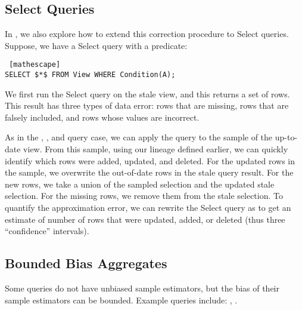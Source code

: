 \iffalse
\begin{proposition} (BOOTSTRAP OVER DIFFERENCES) Let q be an aggregate query that has an unbiased sample estimate, and let $\hat{S}$ and $\hat{S'}$ be sample views as defined before. 
One sample of the bootstrap estimator $s$ is defined as the difference of q applied to random subsample of size $b_1$ (with replacement) of $\hat{S}$ and $\hat{S'}$.
We denote subsamples of the samples as $\hat{S'}_{sub}$ and $\hat{S}_{sub}$ respectively.
\[q(\hat{S'}_{sub}) - q(\hat{S}_{sub})\]
To build the confidence interval, we repeatedly apply this procedure $b_2$ times.
\end{proposition}
\fi

\vspace{-.25em}
\subsection{Select Queries}
In \svc, we also explore how to extend this correction procedure to Select queries.
Suppose, we have a Select query with a predicate:
\begin{lstlisting} [mathescape]
SELECT $*$ FROM View WHERE Condition(A);
\end{lstlisting}

We first run the Select query on the stale view, and this returns a set of rows.
This result has three types of data error: rows that are missing, rows that are falsely included, and rows whose values are incorrect.

As in the \sumfunc, \countfunc, and \avgfunc query case, we can apply the query to the sample of the up-to-date view.
From this sample, using our lineage defined earlier, we can quickly identify which rows were added, updated, and deleted.
For the updated rows in the sample, we overwrite the out-of-date rows in the stale query result.
For the new rows, we take a union of the sampled selection and the updated stale selection.
For the missing rows, we remove them from the stale selection.
To quantify the approximation error, we can rewrite the Select query as \countfunc to get an estimate of number of rows that were updated, added, or deleted (thus three ``confidence'' intervals). 


\iffalse
\subsection{Bounded Bias Aggregates}
Some queries do not have unbiased sample estimators, but the bias of their sample estimators can be bounded. Example queries include: \medfunc, \percfunc.

